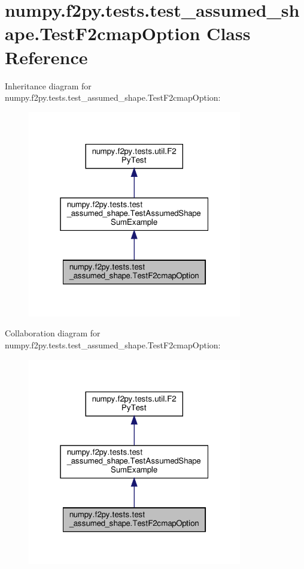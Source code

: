 \hypertarget{classnumpy_1_1f2py_1_1tests_1_1test__assumed__shape_1_1TestF2cmapOption}{}\section{numpy.\+f2py.\+tests.\+test\+\_\+assumed\+\_\+shape.\+Test\+F2cmap\+Option Class Reference}
\label{classnumpy_1_1f2py_1_1tests_1_1test__assumed__shape_1_1TestF2cmapOption}


Inheritance diagram for numpy.\+f2py.\+tests.\+test\+\_\+assumed\+\_\+shape.\+Test\+F2cmap\+Option\+:
\nopagebreak
\begin{figure}[H]
\begin{center}
\leavevmode
\includegraphics[width=265pt]{classnumpy_1_1f2py_1_1tests_1_1test__assumed__shape_1_1TestF2cmapOption__inherit__graph}
\end{center}
\end{figure}


Collaboration diagram for numpy.\+f2py.\+tests.\+test\+\_\+assumed\+\_\+shape.\+Test\+F2cmap\+Option\+:
\nopagebreak
\begin{figure}[H]
\begin{center}
\leavevmode
\includegraphics[width=265pt]{classnumpy_1_1f2py_1_1tests_1_1test__assumed__shape_1_1TestF2cmapOption__coll__graph}
\end{center}
\end{figure}
